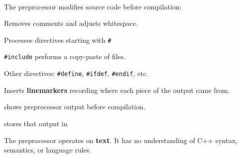 \documentclass[
    10pt,
    dvipsnames,
    svgnames,
    x11names,
    aspectratio=1610,
    english,
    codeminted]{beamer}
\begin{document}
\begin{frame}[fragile]{\secname}
\framesubtitle{\subsecname}
\begin{compactitem}
   \item The preprocessor modifies source code before compilation:
   \begin{compactitem}
       \item Removes comments and adjusts whitespace.
       \item Processes directives starting with \texttt{#}
       \begin{compactitem}
           \item \texttt{#include} performs a copy-paste of files.
           \item Other directives: \texttt{#define}, \texttt{#ifdef}, \texttt{#endif}, etc.
       \end{compactitem}
       \item Inserts \textbf{linemarkers} recording where each piece of the output came from.
   \end{compactitem}
   \item {} shows preprocessor output before compilation.
   \item {} stores that output in 
\end{compactitem}

\medskip
\begin{MyBox}
The preprocessor operates on \textbf{text}. It has no understanding of C++ syntax, semantics, or language rules.
\end{MyBox}
\end{frame}
\end{document}

